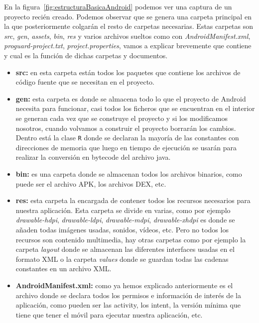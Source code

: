 \begin{itemize}
En la figura~\ref{fig:estructuraBasicaAndroid} podemos ver una captura de un proyecto recién creado. Podemos observar que se genera una carpeta principal en la que posteriormente colgarán el resto de carpetas necesarias. Estas carpetas son \textit{src}, \textit{gen}, \textit{assets}, \textit{bin}, \textit{res} y varios archivos sueltos como con \textit{AndroidManifest.xml}, \textit{proguard-project.txt}, \textit{project.properties}, vamos a explicar brevemente que contiene y cual es la función de dichas carpetas y documentos.

\begin{itemize}

\item \textbf{src:} en esta carpeta están todos los paquetes que contiene los archivos de código fuente que se necesitan en el proyecto.

\item \textbf{gen:} esta carpeta es donde se almacena todo lo que el proyecto de Android necesita para funcionar, casi todos los ficheros que se encuentran en el interior se generan cada vez que se construye el proyecto y si los modificamos nosotros, cuando volvamos a construir el proyecto borrarán los cambios. Dentro está la clase \lstinline{R} donde se declaran la mayoría de las constantes con direcciones de memoria que luego en tiempo de ejecución se usarán para realizar la conversión en bytecode del archivo java.

\item \textbf{bin:} es una carpeta donde se almacenan todos los archivos binarios, como puede ser el archivo APK, los archivos DEX, etc.

\item \textbf{res:} esta carpeta la encargada de contener todos los recursos necesarios para nuestra aplicación. Esta carpeta se divide en varias, como por ejemplo \textit{drawable-hdpi}, \textit{drawable-ldpi}, \textit{drawable-mdpi}, \textit{drawable-xhdpi} es donde se añaden todas imágenes usadas, sonidos, vídeos, etc. Pero no todos los recursos son contenido multimedia, hay otras carpetas como por ejemplo la carpeta \textit{layout} donde se almacenan las diferentes interfaces usadas en el formato XML o la carpeta \textit{values} donde se guardan todas las cadenas constantes en un archivo XML.

\item \textbf{AndroidManifest.xml:} como ya hemos explicado anteriormente es el archivo donde se declara todos los permisos e información de interés de la aplicación, como pueden ser las activity, los intent, la versión mínima que tiene que tener el móvil para ejecutar nuestra aplicación, etc.  


\end{itemize}
\end{itemize}
